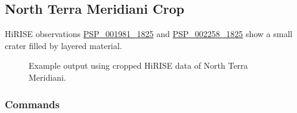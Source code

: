 \clearpage
\subsection{North Terra Meridiani Crop}

\ac{HiRISE} observations
\href{http://hirise.lpl.arizona.edu/PSP_001981_1825}{PSP\_001981\_1825} and
\href{http://hirise.lpl.arizona.edu/PSP_002258_1825}{PSP\_002258\_1825}
show a small crater filled by layered material.

\begin{figure}[h!]
\centering
  \hfil
\caption{Example output using cropped HiRISE data of North Terra Meridiani.}
\label{fig:hirise_nterra_example}
\end{figure}

\subsubsection*{Commands}

